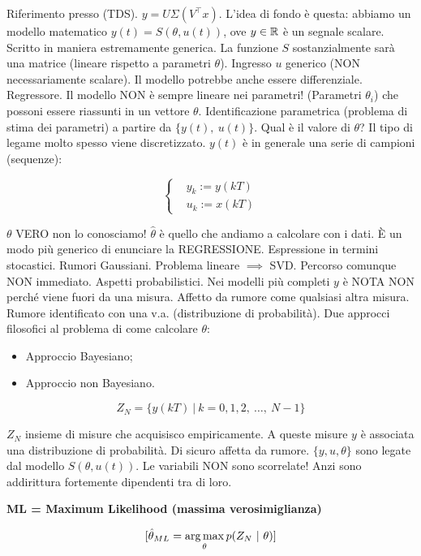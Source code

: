 Riferimento presso (TDS). $y=U\Sigma (V^\top x)$. L'idea di fondo è questa: abbiamo un modello matematico $y(t) = S(\theta,u(t))$, ove $y\in\mathbb{R}$ è un segnale scalare. Scritto in maniera estremamente generica. La funzione $S$ sostanzialmente sarà una matrice (lineare rispetto a parametri $\theta$). Ingresso $u$ generico (NON necessariamente scalare). Il modello potrebbe anche essere differenziale. Regressore. Il modello NON è sempre lineare nei parametri! (Parametri $\theta_i$) che possoni essere riassunti in un vettore $\theta$. Identificazione parametrica (problema di stima dei parametri) a partire da $\{y(t),\ u(t)\}$. Qual è il valore di $\theta$? Il tipo di legame molto spesso viene discretizzato. $y(t)$ è in generale una serie di campioni (sequenze):

\[
	\left\{
	\begin{aligned}
	&y_k := y(kT)\\
	&u_k := x(kT)
	\end{aligned}
	\right.
\]

$\theta$ VERO non lo conosciamo! $\hat{\theta}$ è quello che andiamo a calcolare con i dati. \`E un modo più generico di enunciare la REGRESSIONE. Espressione in termini stocastici. Rumori Gaussiani. Problema lineare $\implies$ SVD. Percorso comunque NON immediato. Aspetti probabilistici. Nei modelli più completi $y$ è NOTA NON perché viene fuori da una misura. Affetto da rumore come qualsiasi altra misura. Rumore identificato con una v.a. (distribuzione di probabilità). Due approcci filosofici al problema di come calcolare $\theta$: 

\begin{itemize}
\item Approccio Bayesiano;
\item Approccio non Bayesiano.
\end{itemize}

\[
	Z_N = \{y(kT)\ |\ k=0,1,2,\ \dots,\ N-1	\}
\]

$Z_N$ insieme di misure che acquisisco empiricamente. A queste misure $y$ è associata una distribuzione di probabilità. Di sicuro  affetta da rumore. $\{y,u,\theta\}$ sono legate dal modello $S(\theta,u(t))$. Le variabili NON sono scorrelate! Anzi sono addirittura fortemente dipendenti tra di loro.

\begin{defn}{\textbf{ML = Maximum Likelihood (massima verosimiglianza)}}

\[
	[\hat{\theta}_{ML} = \operatorname*{arg\,max}_\theta{p(Z_N\ |\ \theta)}]
\]

\end{defn}


